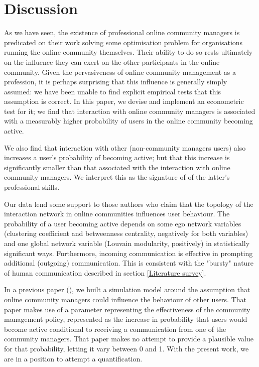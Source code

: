 \section{Discussion}

As we have seen, the existence of professional online community managers is predicated on their work solving some optimisation problem for organisations running the online community themselves. Their ability to do so rests ultimately on the influence they can exert on the other participants in the online community. Given the pervasiveness of online community management as a profession, it is perhaps surprising that this influence is generally simply assumed: we have been unable to find explicit empirical tests that this assumption is correct. In this paper, we devise and implement an econometric test for it; we find that interaction with online community managers is associated with a measurably higher probability of users in the online community becoming active. 

We also find that interaction with other (non-community managers users) also increases a user's probability of becoming active; but that this increase is significantly smaller than that associated with the interaction with online community managers. We interpret this as the signature of of the latter's professional skills. 

Our data lend some support to those authors who claim that the topology of the interaction network in online communities influences user behaviour. The probability of a user becoming active depends on some ego network variables (clustering coefficient and betweenness centrality, negatively for both variables) and one global network variable (Louvain modularity, positively) in statistically significant ways. Furthermore, incoming communication is effective in prompting additional (outgoing) communication. This is consistent with the "bursty" nature of human communication described in section \ref{Literature survey}.

In a previous paper (\cite{cottica2015online}), we built a simulation model around the assumption that online community managers could influence the behaviour of other users. That paper makes use of a parameter representing the effectiveness of the community management policy, represented as the increase in probability that users would become active conditional to receiving a communication from one of the community managers. That paper makes no attempt to provide a plausible value for that probability, letting it vary between 0 and 1. With the present work, we are in a position to attempt a quantification. 